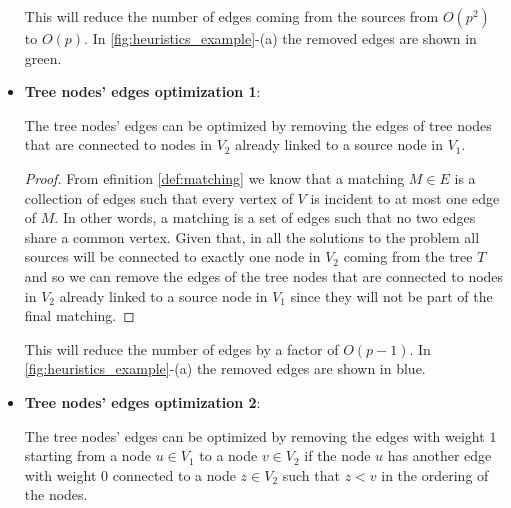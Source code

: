 \begin{itemize}
    This will reduce the number of edges coming from the sources from $O(p^2)$ to $O(p)$. In \cref{fig:heuristics_example}-(a) the removed edges are shown in green. 
    \item \textbf{Tree nodes' edges optimization 1}:
    \begin{lemma} \label{lemma:tree_optimization_1}
        The tree nodes' edges can be optimized by removing the edges of tree nodes that are connected to nodes in $V_2$ already linked to a source node in $V_1$.
    \end{lemma}

    \begin{proof}
        From efinition \cref{def:matching} we know that a matching $M \in E$ is a collection of edges such that every vertex of $V$ is incident to at most one edge of $M$. In other words, a matching is a set of edges such that no two edges share a common vertex. Given that, in all the solutions to the problem all sources will be connected to exactly one node in $V_2$ coming from the tree $T$ and so we can remove the edges of the tree nodes that are connected to nodes in $V_2$ already linked to a source node in $V_1$ since they will not be part of the final matching.
    \end{proof}

    This will reduce the number of edges by a factor of $O(p - 1)$. In \cref{fig:heuristics_example}-(a) the removed edges are shown in blue.

    \item \textbf{Tree nodes' edges optimization 2}:
    \begin{lemma} \label{lemma:tree_optimization_2}
        The tree nodes' edges can be optimized by removing the edges with weight $1$ starting from a node $u \in V_1$ to a node $v \in V_2$ if the node $u$ has another edge with weight $0$ connected to a node $z \in V_2$ such that $z < v$ in the ordering of the nodes.
    \end{lemma}


\end{itemize}
